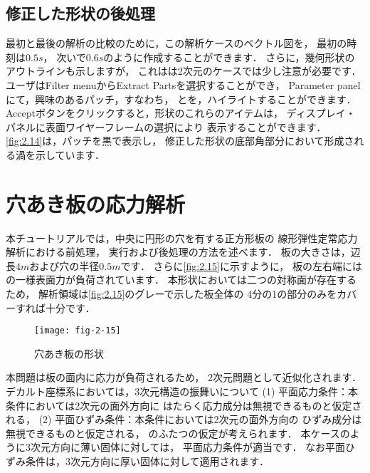 \subsection{修正した形状の後処理}
\label{ssec:2.1.10}
最初と最後の解析の比較のために，この解析ケースのベクトル図を，
最初の時刻は$0.5\unit{s}$，
次いで$0.6\unit{s}$のように作成することができます．
さらに，幾何形状のアウトラインも示しますが，
これはは2次元のケースでは少し注意が必要です．
ユーザはFilter menuからExtract Partsを選択することができ，
Parameter panelにて，興味のあるパッチ，すなわち，
とを，ハイライトすることができます．
Acceptボタンをクリックすると，形状のこれらのアイテムは，
ディスプレイ・パネルに表面ワイヤーフレームの選択により
表示することができます．
\autoref{fig:2.14}は，パッチを黒で表示し，
修正した形状の底部角部分において形成される渦を示しています．



\section{穴あき板の応力解析}
\label{sec:2.2}
%
%
本チュートリアルでは，中央に円形の穴を有する正方形板の
線形弾性定常応力解析における前処理，
実行および後処理の方法を述べます．
板の大きさは，辺長$4\unit{m}$および穴の半径$0.5\unit{m}$です．
さらに\autoref{fig:2.15}に示すように，
板の左右端にはの一様表面力が負荷されています．
本形状においては二つの対称面が存在するため，
解析領域は\autoref{fig:2.15}のグレーで示した板全体の
4分の1の部分のみをカバーすれば十分です．


\begin{figure}[ht]
 \texttt{[image: fig-2-15]}
 \caption{穴あき板の形状}
 \label{fig:2.15}
\end{figure}


本問題は板の面内に応力が負荷されるため，
2次元問題として近似化されます．
デカルト座標系においては，3次元構造の振舞いについて
(1) 平面応力条件：本条件においては2次元の面外方向に
はたらく応力成分は無視できるものと仮定される，
(2) 平面ひずみ条件：本条件においては2次元の面外方向の
ひずみ成分は無視できるものと仮定される，
のふたつの仮定が考えられます．
本ケースのように3次元方向に薄い固体に対しては，
平面応力条件が適当です．
なお平面ひずみ条件は，3次元方向に厚い固体に対して適用されます．

